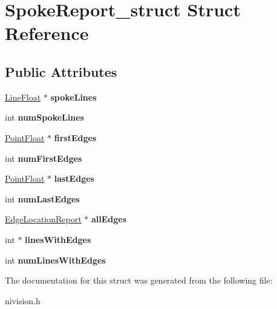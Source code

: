 \hypertarget{structSpokeReport__struct}{
\section{SpokeReport\_\-struct Struct Reference}
\label{structSpokeReport__struct}
}
\subsection*{Public Attributes}
\begin{DoxyCompactItemize}
\item 
\hypertarget{structSpokeReport__struct_a9466942d6c5cd4288866029c7ed49b8e}{
\hyperlink{structLineFloat__struct}{LineFloat} $\ast$ {\bfseries spokeLines}}
\label{structSpokeReport__struct_a9466942d6c5cd4288866029c7ed49b8e}

\item 
\hypertarget{structSpokeReport__struct_a7c4b28d89e7ba38554d3f65215c43e1b}{
int {\bfseries numSpokeLines}}
\label{structSpokeReport__struct_a7c4b28d89e7ba38554d3f65215c43e1b}

\item 
\hypertarget{structSpokeReport__struct_ad6c95f076bf7d190229be06eccb9de4f}{
\hyperlink{structPointFloat__struct}{PointFloat} $\ast$ {\bfseries firstEdges}}
\label{structSpokeReport__struct_ad6c95f076bf7d190229be06eccb9de4f}

\item 
\hypertarget{structSpokeReport__struct_a58328fa9e8a84cc0235f2f1e0ff67a33}{
int {\bfseries numFirstEdges}}
\label{structSpokeReport__struct_a58328fa9e8a84cc0235f2f1e0ff67a33}

\item 
\hypertarget{structSpokeReport__struct_a9de506b9d5a065ac4d34b9694166d2a1}{
\hyperlink{structPointFloat__struct}{PointFloat} $\ast$ {\bfseries lastEdges}}
\label{structSpokeReport__struct_a9de506b9d5a065ac4d34b9694166d2a1}

\item 
\hypertarget{structSpokeReport__struct_aba6c8802a5247ae6cb680353c3abb5e5}{
int {\bfseries numLastEdges}}
\label{structSpokeReport__struct_aba6c8802a5247ae6cb680353c3abb5e5}

\item 
\hypertarget{structSpokeReport__struct_a71b87018515f530defe16fbe5c23717a}{
\hyperlink{structEdgeLocationReport__struct}{EdgeLocationReport} $\ast$ {\bfseries allEdges}}
\label{structSpokeReport__struct_a71b87018515f530defe16fbe5c23717a}

\item 
\hypertarget{structSpokeReport__struct_a91c1a079f0abaa87e6b88ea2f3bc0d2c}{
int $\ast$ {\bfseries linesWithEdges}}
\label{structSpokeReport__struct_a91c1a079f0abaa87e6b88ea2f3bc0d2c}

\item 
\hypertarget{structSpokeReport__struct_a705496f23f7d9e3263951c4d05d46a9a}{
int {\bfseries numLinesWithEdges}}
\label{structSpokeReport__struct_a705496f23f7d9e3263951c4d05d46a9a}

\end{DoxyCompactItemize}


The documentation for this struct was generated from the following file:\begin{DoxyCompactItemize}
\item 
nivision.h\end{DoxyCompactItemize}
